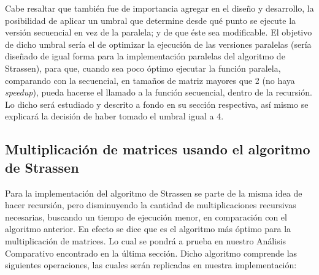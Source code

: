\documentclass{article}
\begin{document}
Cabe resaltar que también fue de importancia agregar en el diseño y desarrollo, la posibilidad de aplicar un umbral que determine desde qué punto se ejecute la versión secuencial en vez de la paralela; y de que éste sea modificable. El objetivo de dicho umbral sería el de optimizar la ejecución de las versiones paralelas (sería diseñado de igual forma para la implementación paralelas del algoritmo de Strassen), para que, cuando sea poco óptimo ejecutar la función paralela, comparando con la secuencial, en tamaños de matriz mayores que 2 (no haya \textit{speedup}), pueda hacerse el llamado a la función secuencial, dentro de la recursión. Lo dicho será estudiado y descrito a fondo en su sección respectiva, así mismo se explicará la decisión de haber tomado el umbral igual a 4. 

\subsection{Multiplicación de matrices usando el algoritmo de Strassen}

Para la implementación del algoritmo de Strassen se parte de la misma idea de hacer recursión, pero disminuyendo la cantidad de multiplicaciones recursivas necesarias, buscando un tiempo de ejecución menor, en comparación con el algoritmo anterior. En efecto se dice que es el algoritmo más óptimo para la multiplicación de matrices. Lo cual se pondrá a prueba en nuestro Análisis Comparativo encontrado en la última sección. Dicho algoritmo comprende las siguientes operaciones, las cuales serán replicadas en nuestra implementación:
\end{document}
